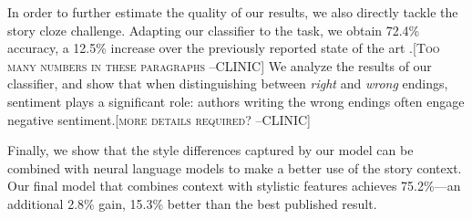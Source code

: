 \documentclass[11pt,a4paper]{article}
\newcommand{\resolved}[1]{}
\newcommand{\roy}[1]{{\color{orange}\textsc{[#1 --rs]}}}
\newcommand{\nascomment}[1]{{\color{blue}\textsc{[#1 --nas]}}}
\newcommand{\clinic}[1]{{\color{magenta}\textsc{[#1 --CLINIC]}}}
\renewcommand{\roy}[1]{}
\begin{document}

In order to further estimate the quality of our results, we 
also directly tackle the story cloze challenge. 
Adapting our classifier to the task, we obtain 72.4\% accuracy, a 12.5\% increase 
over the previously reported state of the art 
\cite{Salle:2016}.\clinic{Too many numbers in these paragraphs}
We analyze the results of our classifier, and show that when distinguishing between {\it right} and {\it wrong} endings,  \resolved{\nascomment{feels like a leap here, maybe
  change wording a bit -- will come back to this.  note after reading
  all the way to the end:  need to be careful about conclusions drawn
  from weights alone }} sentiment plays a significant role: authors writing the wrong endings often engage negative sentiment.\roy{Better wording? we keep it depending on whether we keep our methodology}\clinic{more details required?}

Finally, we show that the style differences captured by our model can be combined with 
neural language models to make a better use of the story context. 
Our final model that combines context with stylistic features achieves
75.2\%---an additional 2.8\% gain, 15.3\% better than the best
published result.\resolved{\footnote{
I commented out this footnote, because we mention this later.  We
should only mention it once and not in the intro.
}}
\end{document}
